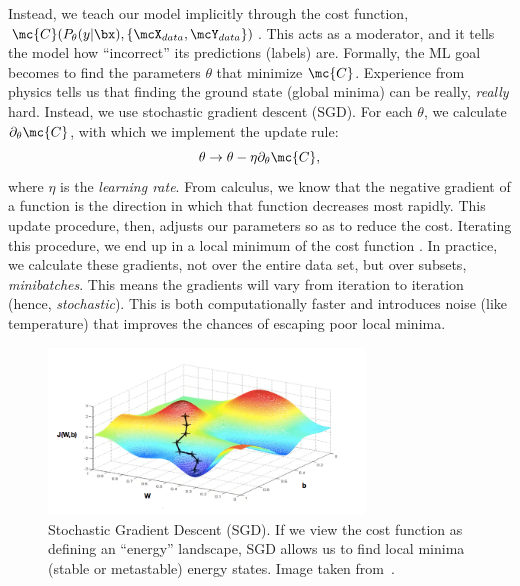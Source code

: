 Instead, we teach our model implicitly through the cost function,
$\mc{C}(P_{\theta}(y\rvert\bx), \{\mcX_{data}, \mcY_{data}\})$. This
acts as a moderator, and it tells the model how ``incorrect'' its
predictions (labels) are.  Formally, the ML goal becomes to find the
parameters $\theta$ that minimize $\mc{C}$. Experience from physics
tells us that finding the ground state (global minima) can be really,
\textit{really} hard.  Instead, we use stochastic gradient descent
(SGD). For each $\theta$, we calculate $\partial_{\theta}\mc{C}$, with
which we implement the update rule:
\begin{equation}%
  \theta \rightarrow \theta - \eta \partial_\theta \mc{C},
\end{equation}%
where $\eta$ is the \textit{learning rate}. From calculus, we know that the
negative gradient of a function is the direction in which that
function decreases most rapidly. This update procedure, then, adjusts
our parameters so as to reduce the cost. Iterating this procedure, we
end up in a local minimum of the cost function . In
practice, we calculate these gradients, not over the entire data set,
but over subsets, \textit{minibatches}. This means the gradients will
vary from iteration to iteration (hence, \textit{stochastic}). This is
both computationally faster and introduces noise (like temperature)
that improves the chances of escaping poor local minima.

\begin{figure}[ht]
  \centering \includegraphics[width=0.75\textwidth]{figures/sgd.png}
  \caption{Stochastic Gradient Descent (SGD). If we view the cost
    function as defining an ``energy'' landscape, SGD allows us to
    find local minima (stable or metastable) energy states. Image
    taken from~\cite{sgd}.\label{fig:sgd} }
\end{figure}

